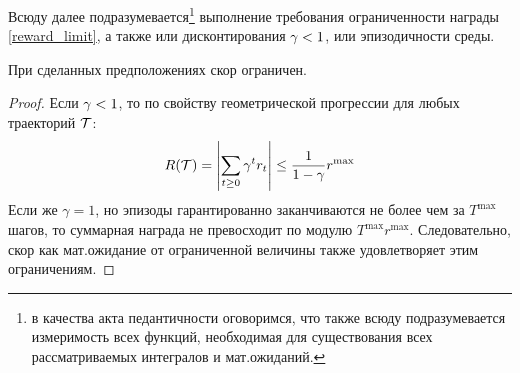 Всюду далее подразумевается\footnote{в качества акта педантичности оговоримся, что также всюду подразумевается измеримость всех функций, необходимая для существования всех рассматриваемых интегралов и мат.ожиданий.} выполнение требования ограниченности награды \eqref{reward_limit}, а также или дисконтирования $\gamma \HM< 1$, или эпизодичности среды.

\begin{proposition}
При сделанных предположениях скор ограничен.
\begin{proof}
Если $\gamma \HM< 1$, то по свойству геометрической прогрессии для любых траекторий $\mathcal{T}$:
\begin{equation*}
R(\mathcal{T}) = \left| \sum_{t \ge 0} \gamma^t r_t \right| \le \frac{1}{1 - \gamma} r^{\max}
\end{equation*}
Если же $\gamma = 1$, но эпизоды гарантированно заканчиваются не более чем за $T^{\max}$ шагов, то суммарная награда не превосходит по модулю $T^{\max} r^{\max}$. Следовательно, скор как мат.ожидание от ограниченной величины также удовлетворяет этим ограничениям.
\end{proof}
\end{proposition}